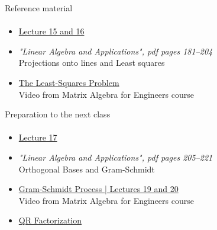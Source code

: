 \documentclass[aspectratio=169]{beamer}
\newcommand{\fbckg}[1]{\usebackgroundtemplate{\texttt{[image: \#1]}}}%
\begin{document}
\begin{frame}[t]{Reference material}
    \framesubtitle{}
    \Large
    \begin{itemize}
        \item \href{https://www.youtube.com/watch?v=Y_Ac6KiQ1t0&list=PL49CF3715CB9EF31D&index=15}{Lecture 15 and 16}
        \item \textit{"Linear Algebra and Applications", pdf pages 181--204 }\\ Projections onto lines and Least squares
        \item \href{https://www.coursera.org/lecture/matrix-algebra-engineers/the-least-squares-problem-I56Qy}{The Least-Squares Problem}\\ Video from Matrix Algebra for Engineers course
    \end{itemize}
\end{frame}

\begin{frame}[t]{Preparation to the next class}
    \framesubtitle{}
    \Large
    \begin{itemize}
        \item \href{https://www.youtube.com/watch?v=Y_Ac6KiQ1t0&list=PL49CF3715CB9EF31D&index=17}{Lecture 17}
        \item \textit{"Linear Algebra and Applications", pdf pages 205--221 }\\ Orthogonal Bases and Gram-Schmidt
        \item \href{https://www.youtube.com/watch?v=eib8uAlzegc&list=PLkZjai-2Jcxlg-Z1roB0pUwFU-P58tvOx&index=20}{Gram-Schmidt Process | Lectures 19 and 20}\\ Video from Matrix Algebra for Engineers course
        \item \href{https://www.youtube.com/watch?v=J41Ypt6Mftc}{QR Factorization}
    \end{itemize}
\end{frame}

\usebackgroundtemplate{}
% 

\fbckg{fibeamer/figs/last_page.png}
\frame[plain]{}
\end{document}
